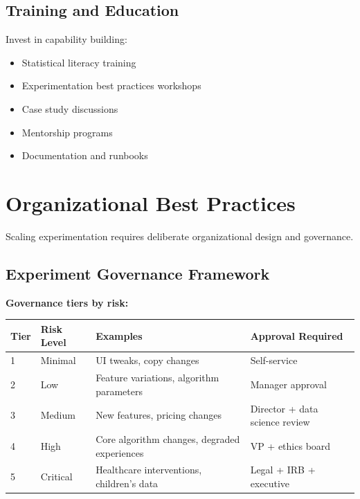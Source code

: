 \subsection{Training and Education}

Invest in capability building:

\begin{itemize}
    \item Statistical literacy training
    \item Experimentation best practices workshops
    \item Case study discussions
    \item Mentorship programs
    \item Documentation and runbooks
\end{itemize}

\section{Organizational Best Practices}

Scaling experimentation requires deliberate organizational design and governance.

\subsection{Experiment Governance Framework}

\textbf{Governance tiers by risk:}

\begin{center}
\begin{tabular}{llp{4cm}p{4cm}}
\toprule
\textbf{Tier} & \textbf{Risk Level} & \textbf{Examples} & \textbf{Approval Required} \\
\midrule
1 & Minimal & UI tweaks, copy changes & Self-service \\
2 & Low & Feature variations, algorithm parameters & Manager approval \\
3 & Medium & New features, pricing changes & Director + data science review \\
4 & High & Core algorithm changes, degraded experiences & VP + ethics board \\
5 & Critical & Healthcare interventions, children's data & Legal + IRB + executive \\
\bottomrule
\end{tabular}
\end{center}

